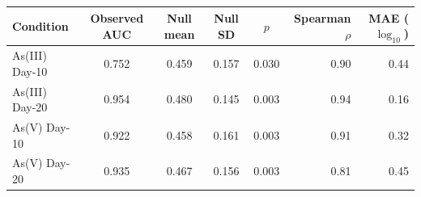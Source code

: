 \begin{tabular}{lccccrr}
  \toprule
  Condition & Observed AUC & Null mean & Null SD & $p$ & Spearman $\rho$ & MAE ($\log_{10}$) \\
  \midrule
  As(III) Day-10 & 0.752 & 0.459 & 0.157 & 0.030 & 0.90 & 0.44 \\
  As(III) Day-20 & 0.954 & 0.480 & 0.145 & 0.003 & 0.94 & 0.16 \\
  As(V) Day-10 & 0.922 & 0.458 & 0.161 & 0.003 & 0.91 & 0.32 \\
  As(V) Day-20 & 0.935 & 0.467 & 0.156 & 0.003 & 0.81 & 0.45 \\
  \bottomrule
\end{tabular}
